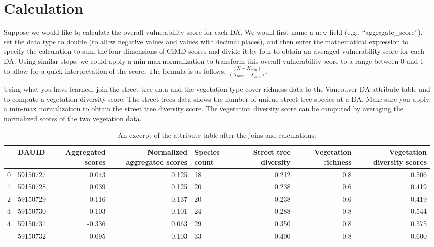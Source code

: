 \documentclass[
]{book}
\begin{document}
\hypertarget{calculation}{%
\section{Calculation}\label{calculation}}

Suppose we would like to calculate the overall vulnerability score for each DA. We would first name a new field (e.g., ``aggregate\_score''), set the data type to double (to allow negative values and values with decimal places), and then enter the mathematical expression to specify the calculation to sum the four dimensions of CIMD scores and divide it by four to obtain an averaged vulnerability score for each DA. Using similar steps, we could apply a min-max normalization to transform this overall vulnerability score to a range between 0 and 1 to allow for a quick interpretation of the score. The formula is as follows: \(\frac{(X - X_{min})}{(X_{max} - X_{min})}\).

Using what you have learned, join the street tree data and the vegetation type cover richness data to the Vancouver DA attribute table and to compute a vegetation diversity score. The street trees data shows the number of unique street tree species at a DA. Make sure you apply a min-max normalization to obtain the street tree diversity score. The vegetation diversity score can be computed by averaging the normalized scores of the two vegetation data.

\begin{table}

\caption{\label{tab:5-case-study-6}An excerpt of the attribute table after the joins and calculations.}
\centering
\begin{tabular}[t]{llrrlrrr}
\toprule
  & DAUID & Aggregated scores & Normalized aggregated scores & Species count & Street tree diversity & Vegetation richness & Vegetation diversity scores\\
\midrule
0 & 59150727 & 0.043 & 0.125 & 18 & 0.212 & 0.8 & 0.506\\
1 & 59150728 & 0.039 & 0.125 & 20 & 0.238 & 0.6 & 0.419\\
2 & 59150729 & 0.116 & 0.137 & 20 & 0.238 & 0.6 & 0.419\\
3 & 59150730 & -0.103 & 0.101 & 24 & 0.288 & 0.8 & 0.544\\
4 & 59150731 & -0.336 & 0.063 & 29 & 0.350 & 0.8 & 0.575\\
\addlinespace
5 & 59150732 & -0.095 & 0.103 & 33 & 0.400 & 0.8 & 0.600\\
\bottomrule
\end{tabular}
\end{table}
\end{document}
